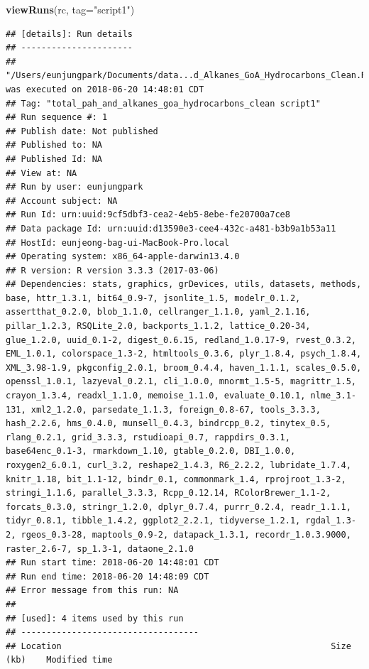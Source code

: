 \documentclass[]{article}
\newenvironment{Shaded}{\begin{snugshade}}{\end{snugshade}}
\newcommand{\DataTypeTok}[1]{\textcolor[rgb]{0.13,0.29,0.53}{#1}}
\newcommand{\KeywordTok}[1]{\textcolor[rgb]{0.13,0.29,0.53}{\textbf{#1}}}
\newcommand{\NormalTok}[1]{#1}
\newcommand{\StringTok}[1]{\textcolor[rgb]{0.31,0.60,0.02}{#1}}
\begin{document}
\begin{Shaded}
\begin{Highlighting}[]
\KeywordTok{viewRuns}\NormalTok{(rc, }\DataTypeTok{tag=}\StringTok{"script1"}\NormalTok{)}
\end{Highlighting}
\end{Shaded}

\begin{verbatim}
## [details]: Run details
## ----------------------
## "/Users/eunjungpark/Documents/data...d_Alkanes_GoA_Hydrocarbons_Clean.R" was executed on 2018-06-20 14:48:01 CDT
## Tag: "total_pah_and_alkanes_goa_hydrocarbons_clean script1"
## Run sequence #: 1
## Publish date: Not published
## Published to: NA
## Published Id: NA
## View at: NA
## Run by user: eunjungpark
## Account subject: NA
## Run Id: urn:uuid:9cf5dbf3-cea2-4eb5-8ebe-fe20700a7ce8
## Data package Id: urn:uuid:d13590e3-cee4-432c-a481-b3b9a1b53a11
## HostId: eunjeong-bag-ui-MacBook-Pro.local
## Operating system: x86_64-apple-darwin13.4.0
## R version: R version 3.3.3 (2017-03-06)
## Dependencies: stats, graphics, grDevices, utils, datasets, methods, base, httr_1.3.1, bit64_0.9-7, jsonlite_1.5, modelr_0.1.2, assertthat_0.2.0, blob_1.1.0, cellranger_1.1.0, yaml_2.1.16, pillar_1.2.3, RSQLite_2.0, backports_1.1.2, lattice_0.20-34, glue_1.2.0, uuid_0.1-2, digest_0.6.15, redland_1.0.17-9, rvest_0.3.2, EML_1.0.1, colorspace_1.3-2, htmltools_0.3.6, plyr_1.8.4, psych_1.8.4, XML_3.98-1.9, pkgconfig_2.0.1, broom_0.4.4, haven_1.1.1, scales_0.5.0, openssl_1.0.1, lazyeval_0.2.1, cli_1.0.0, mnormt_1.5-5, magrittr_1.5, crayon_1.3.4, readxl_1.1.0, memoise_1.1.0, evaluate_0.10.1, nlme_3.1-131, xml2_1.2.0, parsedate_1.1.3, foreign_0.8-67, tools_3.3.3, hash_2.2.6, hms_0.4.0, munsell_0.4.3, bindrcpp_0.2, tinytex_0.5, rlang_0.2.1, grid_3.3.3, rstudioapi_0.7, rappdirs_0.3.1, base64enc_0.1-3, rmarkdown_1.10, gtable_0.2.0, DBI_1.0.0, roxygen2_6.0.1, curl_3.2, reshape2_1.4.3, R6_2.2.2, lubridate_1.7.4, knitr_1.18, bit_1.1-12, bindr_0.1, commonmark_1.4, rprojroot_1.3-2, stringi_1.1.6, parallel_3.3.3, Rcpp_0.12.14, RColorBrewer_1.1-2, forcats_0.3.0, stringr_1.2.0, dplyr_0.7.4, purrr_0.2.4, readr_1.1.1, tidyr_0.8.1, tibble_1.4.2, ggplot2_2.2.1, tidyverse_1.2.1, rgdal_1.3-2, rgeos_0.3-28, maptools_0.9-2, datapack_1.3.1, recordr_1.0.3.9000, raster_2.6-7, sp_1.3-1, dataone_2.1.0
## Run start time: 2018-06-20 14:48:01 CDT
## Run end time: 2018-06-20 14:48:09 CDT
## Error message from this run: NA
## 
## [used]: 4 items used by this run
## -----------------------------------
## Location                                                     Size (kb)    Modified time      

\end{verbatim}
\end{document}
